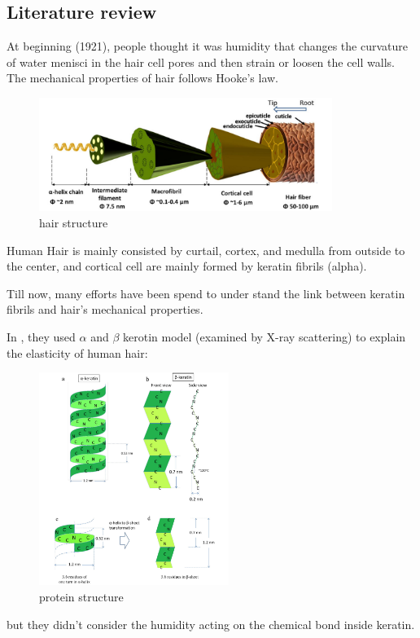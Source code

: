 \documentclass{article}
\begin{document}
\subsection{Literature review}
At beginning (1921), people thought it was humidity that changes the curvature of water menisci in the hair cell pores and then strain or loosen the cell walls. The mechanical properties of hair follows Hooke's law\citep{Whipple_1921}.
\begin{figure}[H]
    \centering
\includegraphics[width=0.85\textwidth]{hair structure.jpg}
    \caption{hair structure\citep{yu2017structure}}
\end{figure}
Human Hair is mainly consisted by curtail, cortex, and medulla from outside to the center, and cortical cell are mainly formed by  keratin fibrils (alpha).

Till now, many efforts have been spend to under stand the link between keratin fibrils and hair's mechanical properties.


 In \citep{yu2017structure}, they used $\alpha$ and $\beta$ kerotin model (examined by X-ray scattering) to explain the elasticity of human hair:
\begin{figure}[H]
    \centering
\includegraphics[width=0.55\textwidth]{protein structure.png}
    \caption{protein structure\citep{yu2017structure}}
\end{figure}
but they didn't consider the humidity acting on the chemical bond inside keratin.
\end{document}
